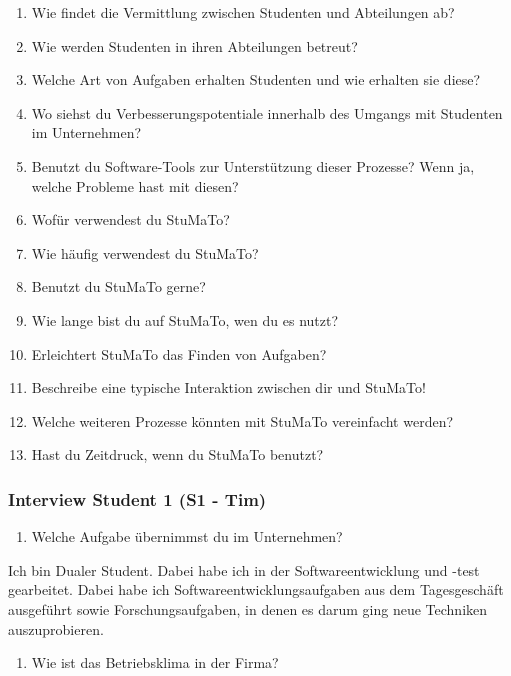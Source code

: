 \documentclass[
  12pt,
  ngerman,
  a4paper,
]{article}
\providecommand{\tightlist}{%
  \setlength{\itemsep}{0pt}\setlength{\parskip}{0pt}}
\begin{document}
\begin{enumerate}
\def\labelenumi{\arabic{enumi}.}
\setcounter{enumi}{4}
\item
  Wie findet die Vermittlung zwischen Studenten und Abteilungen ab?
\item
  Wie werden Studenten in ihren Abteilungen betreut?
\item
  Welche Art von Aufgaben erhalten Studenten und wie erhalten sie diese?
\item
  Wo siehst du Verbesserungspotentiale innerhalb des Umgangs mit
  Studenten im Unternehmen?
\item
  Benutzt du Software-Tools zur Unterstützung dieser Prozesse? Wenn ja,
  welche Probleme hast mit diesen?
\item
  Wofür verwendest du StuMaTo?
\item
  Wie häufig verwendest du StuMaTo?
\item
  Benutzt du StuMaTo gerne?
\item
  Wie lange bist du auf StuMaTo, wen du es nutzt?
\item
  Erleichtert StuMaTo das Finden von Aufgaben?
\item
  Beschreibe eine typische Interaktion zwischen dir und StuMaTo!
\item
  Welche weiteren Prozesse könnten mit StuMaTo vereinfacht werden?
\item
  Hast du Zeitdruck, wenn du StuMaTo benutzt?
\end{enumerate}

\hypertarget{interview-student-1-s1---tim}{%
\subsubsection{Interview Student 1 (S1 -
Tim)}\label{interview-student-1-s1---tim}}

\begin{enumerate}
\def\labelenumi{\arabic{enumi}.}
\tightlist
\item
  Welche Aufgabe übernimmst du im Unternehmen?
\end{enumerate}

Ich bin Dualer Student. Dabei habe ich in der Softwareentwicklung und
-test gearbeitet. Dabei habe ich Softwareentwicklungsaufgaben aus dem
Tagesgeschäft ausgeführt sowie Forschungsaufgaben, in denen es darum
ging neue Techniken auszuprobieren.

\begin{enumerate}
\def\labelenumi{\arabic{enumi}.}
\setcounter{enumi}{1}
\tightlist
\item
  Wie ist das Betriebsklima in der Firma?
\end{enumerate}
\end{document}
